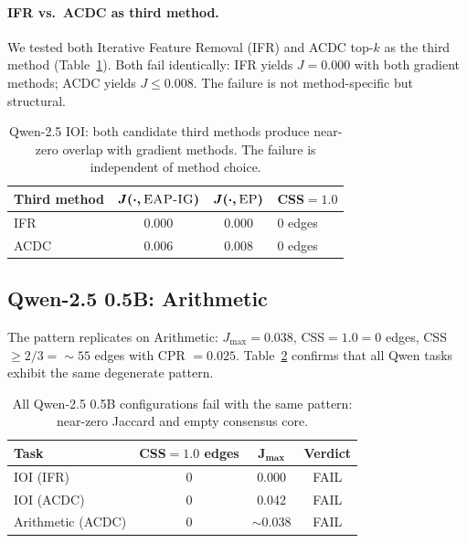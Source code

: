 \documentclass[11pt,a4paper]{article}
\newcommand{\css}{\textsc{CSS}}
\newcommand{\eapig}{\textsc{EAP-IG}}
\newcommand{\ep}{\textsc{EP}}
\newcommand{\acdc}{\textsc{ACDC}}
\begin{document}
\paragraph{IFR vs.\ \acdc{} as third method.}
We tested both Iterative Feature Removal (IFR) and \acdc{} top-$k$ as the third method (Table~\ref{tab:qwen_third}).
Both fail identically: IFR yields $J = 0.000$ with both gradient methods; \acdc{} yields $J \le 0.008$.
The failure is not method-specific but structural.

\begin{table}[t]
\centering
\small
\begin{tabular}{lccl}
\toprule
\textbf{Third method} & $\boldsymbol{J(\cdot, \text{\eapig{}})}$ & $\boldsymbol{J(\cdot, \text{\ep{}})}$ & \textbf{\css{}$= 1.0$} \\
\midrule
IFR   & 0.000 & 0.000 & 0 edges \\
\acdc{} & 0.006 & 0.008 & 0 edges \\
\bottomrule
\end{tabular}
\caption{Qwen-2.5 IOI: both candidate third methods produce near-zero overlap with gradient methods. The failure is independent of method choice.}
\label{tab:qwen_third}
\end{table}

\subsection{Qwen-2.5 0.5B: Arithmetic}

The pattern replicates on Arithmetic: $J_{\max} = 0.038$, \css{}$= 1.0 = 0$ edges, \css{}$\ge 2/3 = \sim 55$ edges with CPR $= 0.025$.
Table~\ref{tab:qwen_tasks} confirms that all Qwen tasks exhibit the same degenerate pattern.

\begin{table}[t]
\centering
\small
\begin{tabular}{lccc}
\toprule
\textbf{Task} & \textbf{\css{}$= 1.0$ edges} & $\boldsymbol{J_{\max}}$ & \textbf{Verdict} \\
\midrule
IOI (IFR)             & 0 & 0.000 & FAIL \\
IOI (\acdc{})         & 0 & 0.042 & FAIL \\
Arithmetic (\acdc{})  & 0 & $\sim$0.038 & FAIL \\
\bottomrule
\end{tabular}
\caption{All Qwen-2.5 0.5B configurations fail with the same pattern: near-zero Jaccard and empty consensus core.}
\label{tab:qwen_tasks}
\end{table}
\end{document}
